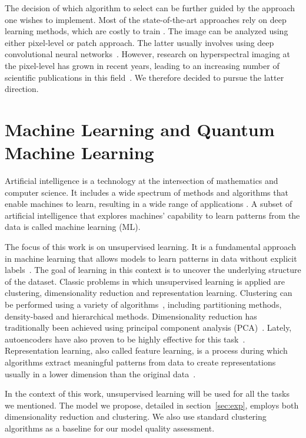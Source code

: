 \documentclass[runningheads]{llncs}
\begin{document}
The decision of which algorithm to select can be further guided by the
approach one wishes to implement. Most of the state-of-the-art approaches rely
on deep learning methods, which are costly to train \cite{GreenAI}. The image
can be analyzed using either pixel-level or patch approach. The latter usually
involves using deep convolutional neural networks~\cite{ %
Morchhale2016}. However, research on hyperspectral imaging at the pixel-level
has grown in recent years, leading to an increasing number of scientific
publications in this field~\cite{Morchhale2016, %
Sifnaios2024, Chen2024}. We therefore decided to pursue the latter direction.

\section{Machine Learning and Quantum Machine Learning} 
\label{sec:qml}

Artificial intelligence is a technology at the intersection of mathematics and
computer science. It includes a wide spectrum of methods and algorithms that
enable machines to learn, resulting in a wide range of applications
\cite{raschka2019, Goodfellow2016}. A subset of artificial intelligence that
explores machines' capability to learn patterns from the data is called
machine learning (ML).

The focus of this work is on unsupervised learning. It is a fundamental approach
in machine learning that allows models to learn patterns in data without
explicit labels~\cite{Naeem2023}. The goal of learning in this context is to
uncover the underlying structure of the dataset. Classic problems in which
unsupervised learning is applied are clustering, dimensionality reduction and
representation learning. Clustering can be performed using a variety of
algorithms~\cite{Bindra2017}, including partitioning methods, density-based and
hierarchical methods. Dimensionality reduction has traditionally been achieved
using principal component analysis (PCA)~\cite{Goodfellow2016}. Lately,
autoencoders have also proven to be highly effective for this
task~\cite{Wang2014}. Representation learning, also called feature learning, is
a process during which algorithms extract meaningful patterns from data to
create representations usually in a lower dimension than the original
data~\cite{Goodfellow2016}.

In the context of this work, unsupervised learning will be used for all the
tasks we mentioned. The model we propose, detailed in section~\ref{sec:exp},
employs both dimensionality reduction and clustering. We also use standard
clustering algorithms as a baseline for our model quality assessment.
\end{document}
